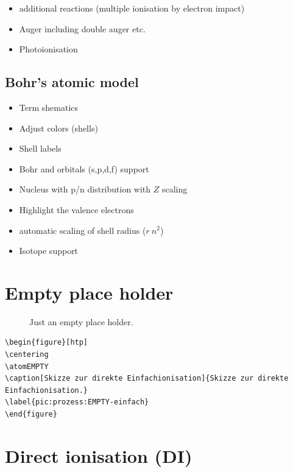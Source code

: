\documentclass[
	a4paper,
	parskip=half,
    pagesize=auto,      		%
    listof=totoc,   		%
    bibliography=totoc,
	11pt
]{scrartcl}
\begin{document}
\begin{itemize}
	\item additional reactions (multiple ionisation by electron impact)
	\item Auger including double auger etc.
	\item Photoionisation
\end{itemize}

\subsection{Bohr's atomic model}

\begin{itemize}
	\item Term shematics
	\item Adjust colors (shells)
	\item Shell labels
	\item Bohr and orbitals (s,p,d,f) support
	\item Nucleus with p/n distribution with $Z$ scaling
	\item Highlight the valence electrons
	\item automatic scaling of shell radius ($r ~ n^2$)
	\item Isotope support 
\end{itemize}



\section{Empty place holder}
 
\begin{figure}[htp]
\centering
\atomEMPTY
\caption[Just an empty place holder]{Just an empty place holder.}
\label{pic:prozess:EMPTY-einfach}
\end{figure}

\begin{lstlisting}
\begin{figure}[htp]
\centering
\atomEMPTY
\caption[Skizze zur direkte Einfachionisation]{Skizze zur direkte Einfachionisation.}
\label{pic:prozess:EMPTY-einfach}
\end{figure}
\end{lstlisting}





\section{Direct ionisation (DI)}
\end{document}

